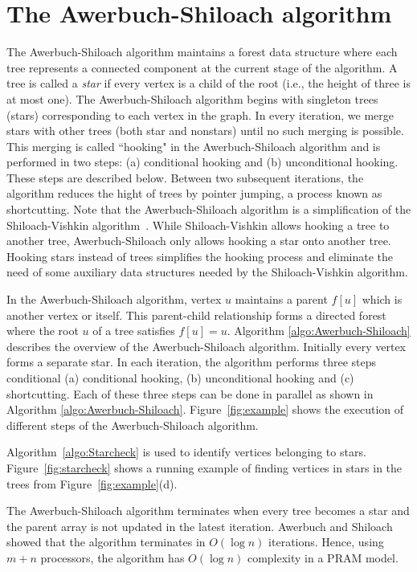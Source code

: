\section{The Awerbuch-Shiloach algorithm}
The Awerbuch-Shiloach algorithm maintains a forest data structure where each tree represents a connected component at the current stage of the algorithm.
A tree is called a \emph{star} if every vertex is a child of the root (i.e., the height of three is at most one).
The Awerbuch-Shiloach algorithm begins with singleton trees (stars) corresponding to each vertex in the graph.
In every iteration, we merge stars with other trees (both star and nonstars) until no such merging is possible. 
This merging is called ``hooking" in the Awerbuch-Shiloach algorithm and is performed in two steps: (a) conditional hooking and (b) unconditional hooking. These steps are described below.
Between two subsequent iterations, the algorithm reduces the hight of trees by pointer jumping, a process known as shortcutting. 
Note that the Awerbuch-Shiloach algorithm is a simplification of the Shiloach-Vishkin algorithm~\cite{shiloach1980log}. While Shiloach-Vishkin allows hooking a tree to another tree, Awerbuch-Shiloach only allows hooking a star onto another tree. Hooking stars instead of trees simplifies the hooking process and eliminate the need of some auxiliary data structures needed by the Shiloach-Vishkin algorithm.

In the Awerbuch-Shiloach algorithm, vertex $u$ maintains a parent $f[u]$ which is another vertex or itself. 
This parent-child relationship forms a directed forest where the root $u$ of a tree satisfies $f[u]=u$.
Algorithm \ref{algo:Awerbuch-Shiloach} describes the overview of the Awerbuch-Shiloach algorithm.
Initially every vertex forms a separate star. 
In each iteration, the algorithm performs three steps conditional (a) conditional hooking, (b) unconditional hooking and (c) shortcutting.
Each of these three steps can be done in parallel as shown in Algorithm \ref{algo:Awerbuch-Shiloach}.
Figure~\ref{fig:example} shows the execution of different steps of the Awerbuch-Shiloach algorithm.

Algorithm~\ref{algo:Starcheck} is used to identify vertices belonging to stars.
Figure~\ref{fig:starcheck} shows a running example of finding vertices in stars in the trees from Figure~\ref{fig:example}(d).

The Awerbuch-Shiloach algorithm terminates when every tree becomes a star and the parent array is not updated in the latest iteration. 
Awerbuch and Shiloach showed that the algorithm terminates in $O(\log n)$ iterations. Hence, using $m+n$ processors, the algorithm has $O(\log n)$ complexity in a PRAM model. 





